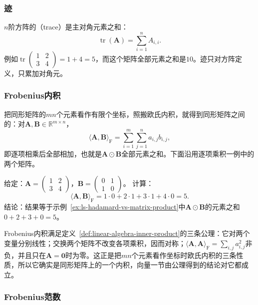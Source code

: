\subsubsection{迹}
\label{sec:prelim-matrix-trace}

$n$阶方阵的（trace）是主对角元素之和：
\[
 \operatorname{tr}(\bm A)=\sum_{i=1}^n A_{i,i}.
\]
例如$\operatorname{tr}\left(\begin{smallmatrix}1&2\\3&4\end{smallmatrix}\right)=1+4=5$，而这个矩阵全部元素之和是$10$。迹只对方阵定义，只累加对角元。

\subsubsection{Frobenius内积}

把同形矩阵的$mn$个元素看作有限个坐标，照搬欧氏内积，就得到同形矩阵之间的：对$\bm A,\bm B\in\mathbb R^{m\times n}$，
\[
 \langle\bm A,\bm B\rangle_{\mathrm F}=\sum_{i=1}^m\sum_{j=1}^na_{i,j}b_{i,j},
\]
即逐项相乘后全部相加，也就是$\bm A\odot\bm B$全部元素之和。下面沿用逐项乘积一例中的两个矩阵。
\begin{example}[Frobenius内积的计算]
\label{ex:ls-frobenius-inner-product}
给定：$\bm A=\left(\begin{smallmatrix}1&2\\3&4\end{smallmatrix}\right)$，$\bm B=\left(\begin{smallmatrix}0&1\\1&0\end{smallmatrix}\right)$。
计算：
\[
 \langle\bm A,\bm B\rangle_{\mathrm F}=1\cdot0+2\cdot1+3\cdot1+4\cdot0=5.
\]
结论：结果等于示例~\ref{ex:ls-hadamard-vs-matrix-product}中$\bm A\odot\bm B$的元素之和$0+2+3+0=5$。
\end{example}

Frobenius内积满足定义~\ref{def:linear-algebra-inner-product}的三条公理：它对两个变量分别线性；交换两个矩阵不改变各项乘积，因而对称；$\langle\bm A,\bm A\rangle_{\mathrm F}=\sum_{i,j}a_{i,j}^2$非负，并且只在$\bm A=\bm0$时为零。这正是把$mn$个元素看作坐标时欧氏内积的三条性质，所以它确实是同形矩阵上的一个内积，向量一节由公理得到的结论对它都成立。

\subsubsection{Frobenius范数}
\label{sec:ls-frobenius-norm}

